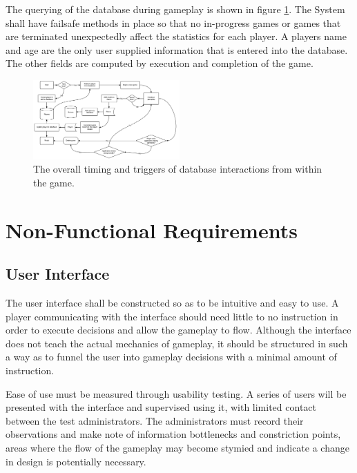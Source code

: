 \documentclass[12pt]{IEEEtran}
\begin{document}
	The querying of the database during gameplay is shown in figure \ref{fig:dbflow}. The System shall have failsafe 			methods in place so that no in-progress games or games that are terminated unexpectedly affect the statistics for each 		player. A players name and age are the only user supplied information that is entered into the database. The other 			fields are computed by execution and completion of the game.

	\begin{figure}[b]	
		\centering
		\includegraphics[width=0.5\textwidth]{DatabaseFlowChart.png}
		\caption[Database Query Flow]{ The overall timing and triggers of database interactions from within the game.  }
		\label{fig:dbflow}
	\end{figure}


\section{Non-Functional Requirements}
\label{sec:nonFuncReq}

\subsection{User Interface}
\label{subsec:ui}
	The user interface shall be constructed so as to be intuitive and easy to use. A player communicating with the interface should need little to no instruction in order to execute decisions and allow the gameplay to flow. Although the interface does not teach the actual mechanics of gameplay, it should be structured in such a way as to funnel the user into gameplay decisions with a minimal amount of instruction. 
	
	Ease of use must be measured through usability testing. A series of users will be presented with the interface and supervised using it, with limited contact between the test administrators. The administrators must record their observations and make note of information bottlenecks and constriction points, areas where the flow of the gameplay may become stymied and indicate a change in design is potentially necessary. 
	
\end{document}
